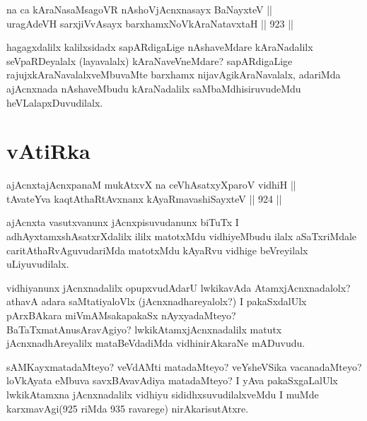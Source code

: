 \begin{shl}
na ca kAraNasaMsagoVR nAshoV\s jAcnxnasayx BaNayxteV || \\
uragAdeVH sarxjiVvAsayx barxhamxNoV\s kAraNatavxtaH \hfill || 923 ||  
\end{shl}

\begin{artha}
hagagxdalilx kalilxsidadx sapARdigaLige nAshaveMdare kAraNadalilx seVpaRDeyalalx (layavalalx) kAraNaveVneMdare? sapARdigaLige rajujxkAraNavalalxveMbuvaMte barxhamx nijavAgikAraNavalalx, adariMda ajAcnxnada nAshaveMbudu kAraNadalilx saMbaMdhisiruvudeMdu heVLalapxDuvudilalx.
\end{artha}

\section*{vAtiRka}


\begin{shl}
ajAcnxtajAcnxpanaM mukAtxvX na ceVhAsatxyXparoV vidhiH || \\
tAvateYva kaqtAthaRtAvxnanx kAyaRmavashiSayxteV \hfill || 924 ||  
\end{shl}

\begin{artha}
ajAcnxta vasutxvanunx jAcnxpisuvudanunx biTuTx I adhAyxtamxshAsatxrXdalilx ililx matotxMdu vidhiyeMbudu ilalx aSaTxriMdale caritAthaRvAguvudariMda matotxMdu kAyaRvu vidhige beVreyilalx uLiyuvudilalx.
\end{artha}

\begin{artha}
vidhiyanunx jAcnxnadalilx opupxvudAdarU lwkikavAda AtamxjAcnxnadalolx? athavA adara saMtatiyaloVlx (jAcnxnadhareyalolx?) I pakaSxdalUlx pArxBAkara miVmAMsakapakaSx nAyxyadaMteyo? BaTaTxmatAnusAravAgiyo? lwkikAtamxjAcnxnadalilx matutx jAcnxnadhAreyalilx mataBeVdadiMda vidhinirAkaraNe mADuvudu.
\end{artha}

\begin{artha}
sAMKayxmatadaMteyo? veVdAMti matadaMteyo? veYsheVSika vacanadaMteyo? loVkAyata eMbuva savxBAvavAdiya matadaMteyo? I yAva pakaSxgaLalUlx lwkikAtamxna jAcnxnadalilx vidhiyu sididhxsuvudilalxveMdu I muMde karxmavAgi(925 riMda 935 ravarege) nirAkarisutAtxre.
\end{artha}


